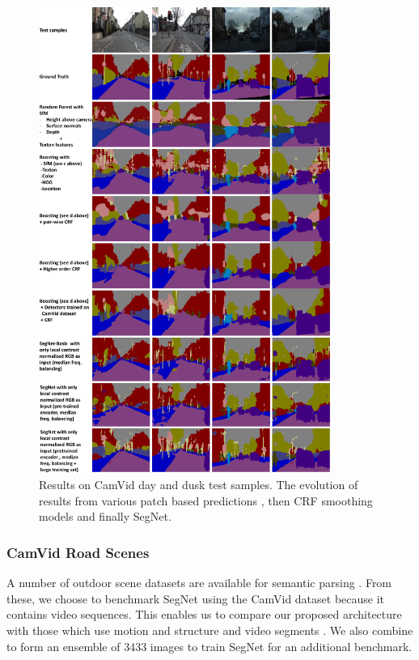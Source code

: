 \begin{figure}
\centering
\includegraphics[width=0.85\textwidth]{segnet/CamVidQualitative.pdf}
\caption[CamVid qualitative results.]{Results on CamVid day and dusk test samples. The evolution of results from various patch based predictions \citep{Jamie2,brostow2008segmentation}, then CRF smoothing models \citep{LadickyECCV,Sturgess} and finally SegNet.
}
\label{CamVidQualy}
\end{figure}

\subsubsection{CamVid Road Scenes}
\label{CamVid}
A number of outdoor scene datasets are available for semantic parsing \citep{gould2009decomposing,russell2008labelme,brostow2009semantic,Geiger2012CVPR}. From these, we choose to benchmark SegNet using the CamVid dataset \citep{brostow2009semantic} because it contains video sequences. This enables us to compare our proposed architecture with those which use motion and structure \citep{LadickyECCV,Sturgess,brostow2008segmentation} and video segments \citep{tighe2013superparsing}. We also combine \citep{gould2009decomposing,russell2008labelme,brostow2009semantic,Geiger2012CVPR} to form an ensemble of 3433 images to train SegNet for an additional benchmark.

